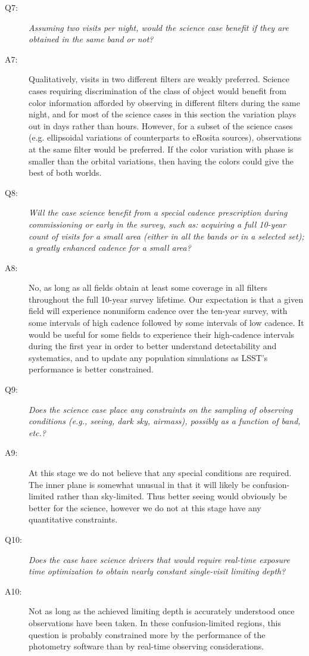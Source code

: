 \begin{description}
 \item[Q7:] {\it Assuming two visits per night, would the science case
 benefit if they are obtained in the same band or not?}

\item[A7:] Qualitatively, visits in two different filters are weakly preferred. Science cases requiring discrimination of
   the class of object would benefit from color information afforded
   by observing in different filters during the same night, and for
   most of the science cases in this section the variation plays out
   in days rather than hours. However, for a subset of the science
   cases (e.g. ellipsoidal variations of counterparts to eRosita
   sources), observations at the same filter would be preferred. If
   the color variation with phase is smaller than the orbital
   variations, then having the colors could give the best of both
   worlds.

 \item[Q8:] {\it Will the case science benefit from a special cadence
 prescription during commissioning or early in the survey, such as:
 acquiring a full 10-year count of visits for a small area (either in all
 the bands or in a  selected set); a greatly enhanced cadence for a small
 area?}

\item[A8:] No, as long as all fields obtain at least some
  coverage in all filters throughout the full 10-year survey
  lifetime. Our expectation is that a given field will experience
  nonuniform cadence over the ten-year survey, with some intervals of
  high cadence followed by some intervals of low cadence. It would be
  useful for some fields to experience their high-cadence intervals
  during the first year in order to better understand detectability
  and systematics, and to update any population simulations as LSST's
  performance is better constrained.

 \item[Q9:] {\it Does the science case place any constraints on the
 sampling of observing conditions (e.g., seeing, dark sky, airmass),
 possibly as a function of band, etc.?}

\item[A9:] At this stage we do not believe that any special
   conditions are required. The inner plane is somewhat unusual in
   that it will likely be confusion-limited rather than
   sky-limited. Thus better seeing would obviously be better for the
   science, however we do not at this stage have any quantitative
   constraints. 

 \item[Q10:] {\it Does the case have science drivers that would require
 real-time exposure time optimization to obtain nearly constant
 single-visit limiting depth?}

\item[A10:] Not as long as the achieved limiting depth is accurately
   understood once observations have been taken. In these
   confusion-limited regions, this question is probably constrained
   more by the performance of the photometry software than by
   real-time observing considerations.

 \end{description}



\navigationbar
